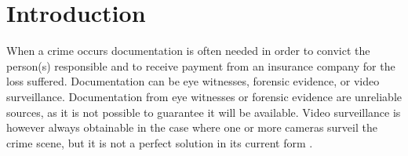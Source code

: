 \chapter{Introduction}
\label{chap:introduction}


When a crime occurs documentation is often needed in order to convict the person(s) responsible and to receive payment from an insurance company for the loss suffered.
Documentation can be eye witnesses, forensic evidence, or video surveillance.
Documentation from eye witnesses or forensic evidence are unreliable sources, as it is not possible to guarantee it will be available.
Video surveillance is however always obtainable in the case where one or more cameras surveil the crime scene, but it is not a perfect solution in its current form \citep{whats-wrong-public-video-surveillance}.






